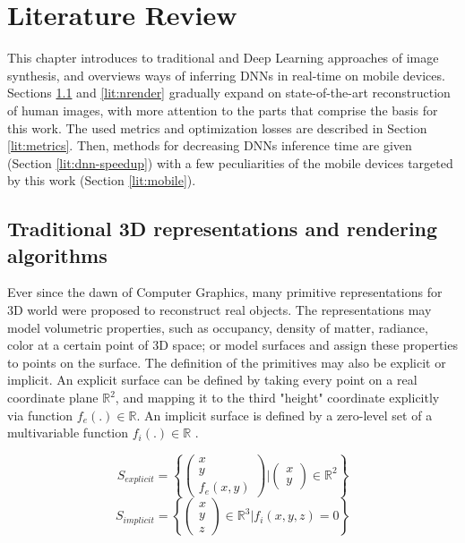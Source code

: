 \chapter{Literature Review}\label{chapter:lit}

This chapter introduces to traditional and Deep Learning approaches of image synthesis, and overviews ways of inferring DNNs in real-time on mobile devices. Sections \ref{lit:traditional-cg} and \ref{lit:nrender} gradually expand on state-of-the-art reconstruction of human images, with more attention to the parts that comprise the basis for this work. The used metrics and optimization losses are described in Section \ref{lit:metrics}. Then, methods for decreasing DNNs inference time are given (Section \ref{lit:dnn-speedup}) with a few peculiarities of the mobile devices targeted by this work (Section \ref{lit:mobile}).

\section{Traditional 3D representations and rendering algorithms}
\label{lit:traditional-cg}

Ever since the dawn of Computer Graphics, many primitive representations for 3D world were proposed to reconstruct real objects. The representations may model volumetric properties, such as occupancy, density of matter, radiance, color at a certain point of 3D space; or model surfaces and assign these properties to points on the surface. The definition of the primitives may also be explicit or implicit. An explicit surface can be defined by taking every point on a real coordinate plane $\mathbb{R}^2$, and mapping it to the third "height" coordinate explicitly via function $f_e(.) \in \mathbb{R}$. An implicit surface is defined by a zero-level set of a multivariable function $f_i(.) \in \mathbb{R}$ \cite{survey:advances-nn22}.
\begin{multicols}{2}
\setlength\abovedisplayskip{0pt}
\noindent
\begin{equation}
	\renewcommand\arraystretch{0.6}
	S_{explicit} = \left\{ 
	\left( \begin{array}{c} x \\ y \\ f_{e}(x,y) \end{array} \right) \Bigg\rvert 
	\left( \begin{array}{c} x \\ y \end{array} \right) \in \mathbb{R}^2
	\right\}
\end{equation}
\begin{equation}
	\renewcommand\arraystretch{0.6}
	S_{implicit} = \left\{ \begin{pmatrix} x \\ y \\ z \end{pmatrix} \in \mathbb{R}^3 \Bigg\rvert f_{i}(x, y, z) = 0 \right\}
\end{equation}
\setlength\belowdisplayskip{0pt} 
\end{multicols} 

